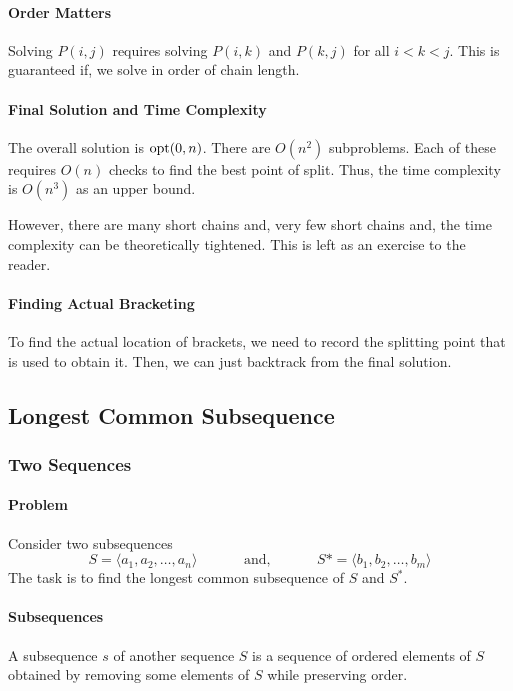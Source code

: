 \paragraph{Order Matters}
Solving \(P(i, j)\) requires solving  \(P(i, k)\) and \(P(k, j)\) for all  \(i < k < j\).
This is guaranteed if, we solve in order of chain length.

\paragraph{Final Solution and Time Complexity}
The overall solution is \(\mathrm{opt} (0, n)\).
There are \(O(n^2)\) subproblems. Each of these requires \(O(n)\)
checks to find the best point of split. Thus, the time complexity is
\(O(n^3)\) as an upper bound.

However, there are many short chains and, very few short chains and,
the time complexity can be theoretically tightened. This is left as
an exercise to the reader.


\paragraph{Finding Actual Bracketing}
To find the actual location of brackets, we need to record the splitting point
that is used to obtain it. Then, we can just backtrack from the final solution.

\subsection{Longest Common Subsequence}

\subsubsection{Two Sequences}

\paragraph{Problem}
Consider two subsequences \[
  S = \langle a_1, a_2, \ldots, a_n \rangle \qquad
  \quad \text{ and, } \quad 
  \qquad S* = \langle b_1, b_2, \ldots, b_m \rangle
\]
The task is to find the longest common subsequence of \(S\) and \(S^*\).

\paragraph{Subsequences}
A subsequence \(s\) of another sequence  \(S\) is a sequence of ordered elements
of \(S\) obtained by removing some elements of  \(S\) while preserving order.

